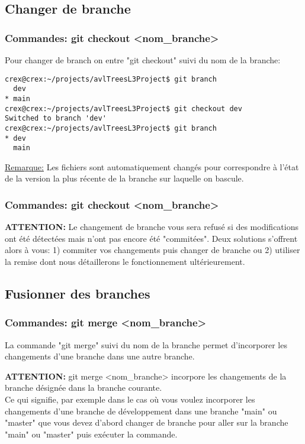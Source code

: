 \documentclass{beamer}
\begin{document}
\subsection{Changer de branche}
\begin{frame}[fragile]
\frametitle{Commandes: git checkout <nom\_branche>}

Pour changer de branch on entre "git checkout" suivi du nom de la branche:
\smallskip

\begin{mdframed}[style=Bash]
    \begin{lstlisting}[style=Bash, caption={Exemple de création et de suppression de branche}]
crex@crex:~/projects/avlTreesL3Project$ git branch
  dev
* main
crex@crex:~/projects/avlTreesL3Project$ git checkout dev
Switched to branch 'dev'
crex@crex:~/projects/avlTreesL3Project$ git branch
* dev
  main
    \end{lstlisting}
\end{mdframed}
\medskip

\underline{Remarque:} Les fichiers sont automatiquement changés pour correspondre à l'état de la version la plus récente de la branche sur laquelle on bascule.\\
\smallskip
\end{frame}

\begin{frame}
\frametitle{Commandes: git checkout <nom\_branche>}
\textbf{ATTENTION:} Le changement de branche vous sera refusé si des modifications ont été détectées mais n'ont pas encore été "commitées". Deux solutions s'offrent alors à vous: 1) commiter vos changements puis changer de branche ou 2) utiliser la remise dont nous détaillerons le fonctionnement ultérieurement.\\
\end{frame}

\subsection{Fusionner des branches}
\begin{frame}
\frametitle{Commandes: git merge <nom\_branche>}
La commande "git merge" suivi du nom de la branche permet d'incorporer les changements d'une branche dans une autre branche.\\
\medskip

\textbf{ATTENTION:} git merge <nom\_branche> incorpore les changements de la branche désignée dans la branche courante.\\
\smallskip
Ce qui signifie, par exemple dans le cas où vous voulez incorporer les changements d'une branche de développement dans une branche "main" ou "master" que vous devez d'abord changer de branche pour aller sur la branche "main" ou "master" puis exécuter la commande.
\end{frame}
\end{document}
